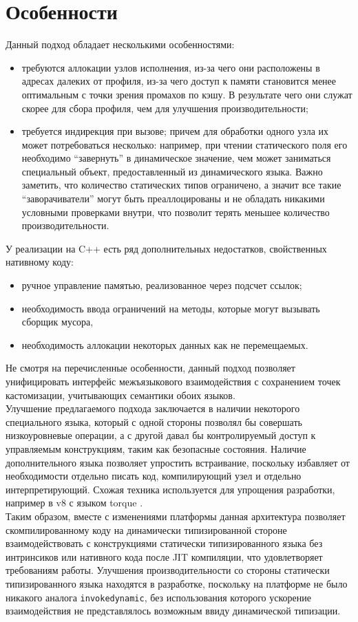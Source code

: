 \documentclass[times,specification,annotation]{itmo-student-thesis}
\begin{document}
\section{Особенности}
Данный подход обладает несколькими особенностями:
\begin{itemize}
	\item требуются аллокации узлов исполнения, из-за чего они расположены в адресах далеких от профиля, из-за чего доступ к памяти становится менее оптимальным с точки зрения промахов по кэшу. В результате чего они служат скорее для сбора профиля, чем для улучшения производительности;
	\item требуется индирекция при вызове; причем для обработки одного узла их может потребоваться несколько: например, при чтении статического поля его необходимо ``завернуть'' в динамическое значение, чем может заниматься специальный объект, предоставленный из динамического языка. Важно заметить, что количество статических типов ограничено, а значит все такие ``заворачиватели'' могут быть преаллоцированы и не обладать никакими условными проверками внутри, что позволит терять меньшее количество производительности.
\end{itemize}

У реализации на C++ есть ряд дополнительных недостатков, свойственных нативному коду:
\begin{itemize}
	\item ручное управление памятью, реализованное через подсчет ссылок;
	\item необходимость ввода ограничений на методы, которые могут вызывать сборщик мусора,
	\item необходимость аллокации некоторых данных как не перемещаемых.
\end{itemize}

\chapterconclusion
Не смотря на перечисленные особенности, данный подход позволяет унифицировать интерфейс межъязыкового взаимодействия с сохранением точек кастомизации, учитывающих семантики обоих языков.\\
Улучшение предлагаемого подхода заключается в наличии некоторого специального языка, который с одной стороны позволял бы совершать низкоуровневые операции, а с другой давал бы контролируемый доступ к управляемым конструкциям, таким как безопасные состояния. Наличие дополнительного языка позволяет упростить встраивание, поскольку избавляет от необходимости отдельно писать код, компилирующий узел и отдельно интерпретирующий. Схожая техника используется для упрощения разработки, например в v8 с языком torque \cite{torque}.\\
Таким образом, вместе с изменениями платформы данная архитектура позволяет скомпилированному коду на динамически типизированной стороне взаимодействовать с конструкциями статически типизированного языка без интринсиков или нативного кода после JIT компиляции, что удовлетворяет требованиям работы. Улучшения производительности со стороны статически типизированного языка находятся в разработке, поскольку на платформе не было никакого аналога \texttt{invokedynamic}, без использования которого ускорение взаимодействия не представлялось возможным ввиду динамической типизации.
\end{document}
